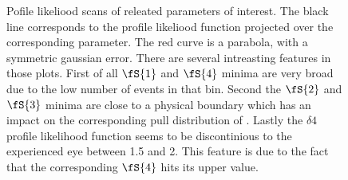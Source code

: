 \begin{figure}[h]
  \centering
  \begin{subfigure}{0.5\textwidth}
    \scalebox{0.60}{}
    \caption{}
    \label{nll_ASMag2_bin1}
  \end{subfigure}%
  \hfill%
  \begin{subfigure}{0.5\textwidth}
    \scalebox{0.60}{}
    \caption{}
    \label{nll_ASPhase_bin1}
  \end{subfigure}
  \begin{subfigure}{0.5\textwidth}
    \scalebox{0.60}{}
    \caption{}
    \label{nll_ASMag2_bin1}
  \end{subfigure}%
  \hfill%
  \begin{subfigure}{0.5\textwidth}
    \scalebox{0.60}{}
    \caption{}
    \label{nll_ASPhase_bin3}
  \end{subfigure}
  \begin{subfigure}{0.5\textwidth}
    \scalebox{0.60}{}
    \caption{}
    \label{nll_ASMag2_bin3}
  \end{subfigure}%
  \hfill%
  \begin{subfigure}{0.5\textwidth}
    \scalebox{0.60}{}
    \caption{}
    \label{nll_ASPhase_bin3}
  \end{subfigure}
  \begin{subfigure}{0.5\textwidth}
    \scalebox{0.60}{}
    \caption{}
    \label{nll_ASMag2_bin4}
  \end{subfigure}%
  \hfill%
  \begin{subfigure}{0.5\textwidth}
    \scalebox{0.60}{}
    \caption{}
    \label{nll_ASPhase_bin4}
  \end{subfigure}
\caption{Pofile likeliood scans of \swave releated parameters of interest. The black line corresponds to the profile likeliood
         function projected over the corresponding parameter. The red curve is a parabola, with a symmetric gaussian 
         error. There are several intreasting features in those plots. First of all $\fS{1}$ and $\fS{4}$ minima are very broad
         due to the low number of events in that \mkpi bin. Second the $\fS{2}$ and $\fS{3}$ minima are close to a physical boundary 
         which has an impact on the corresponding pull distribution of . Lastly the $\delta{4}$ profile likelihood
         function seems to be discontinious to the experienced eye between 1.5 and 2. This feature is due to the fact that the corresponding
         $\fS{4}$ hits its upper value.}
\end{figure}


